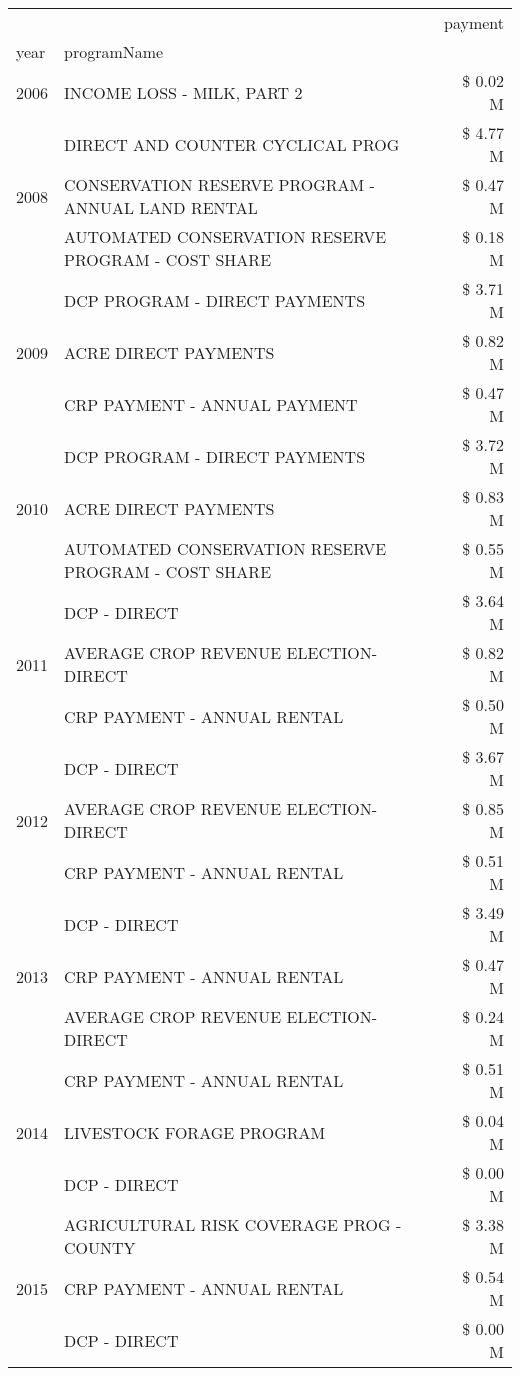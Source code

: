 \begin{tabular}{llr}
\toprule
 &  & payment \\
year & programName &  \\
\midrule
2006 & INCOME LOSS - MILK, PART 2 & \$ 0.02 M \\
\cline{1-3}
\multirow[t]{3}{*}{2008} & DIRECT AND COUNTER CYCLICAL PROG & \$ 4.77 M \\
 & CONSERVATION RESERVE PROGRAM - ANNUAL LAND RENTAL & \$ 0.47 M \\
 & AUTOMATED CONSERVATION RESERVE PROGRAM - COST SHARE & \$ 0.18 M \\
\cline{1-3}
\multirow[t]{3}{*}{2009} & DCP PROGRAM - DIRECT PAYMENTS & \$ 3.71 M \\
 & ACRE DIRECT PAYMENTS & \$ 0.82 M \\
 & CRP PAYMENT - ANNUAL PAYMENT & \$ 0.47 M \\
\cline{1-3}
\multirow[t]{3}{*}{2010} & DCP PROGRAM - DIRECT PAYMENTS & \$ 3.72 M \\
 & ACRE DIRECT PAYMENTS & \$ 0.83 M \\
 & AUTOMATED CONSERVATION RESERVE PROGRAM - COST SHARE & \$ 0.55 M \\
\cline{1-3}
\multirow[t]{3}{*}{2011} & DCP - DIRECT & \$ 3.64 M \\
 & AVERAGE CROP REVENUE ELECTION-DIRECT & \$ 0.82 M \\
 & CRP PAYMENT - ANNUAL RENTAL & \$ 0.50 M \\
\cline{1-3}
\multirow[t]{3}{*}{2012} & DCP - DIRECT & \$ 3.67 M \\
 & AVERAGE CROP REVENUE ELECTION-DIRECT & \$ 0.85 M \\
 & CRP PAYMENT - ANNUAL RENTAL & \$ 0.51 M \\
\cline{1-3}
\multirow[t]{3}{*}{2013} & DCP - DIRECT & \$ 3.49 M \\
 & CRP PAYMENT - ANNUAL RENTAL & \$ 0.47 M \\
 & AVERAGE CROP REVENUE ELECTION-DIRECT & \$ 0.24 M \\
\cline{1-3}
\multirow[t]{3}{*}{2014} & CRP PAYMENT - ANNUAL RENTAL & \$ 0.51 M \\
 & LIVESTOCK FORAGE PROGRAM & \$ 0.04 M \\
 & DCP - DIRECT & \$ 0.00 M \\
\cline{1-3}
\multirow[t]{3}{*}{2015} & AGRICULTURAL RISK COVERAGE PROG - COUNTY & \$ 3.38 M \\
 & CRP PAYMENT - ANNUAL RENTAL & \$ 0.54 M \\
 & DCP - DIRECT & \$ 0.00 M \\

\end{tabular}
